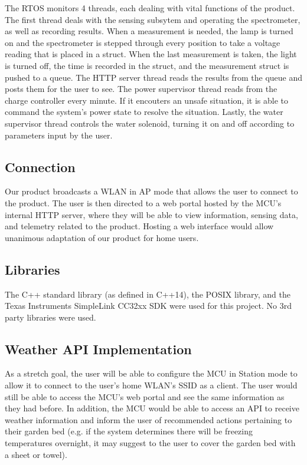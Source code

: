 \documentclass[journal]{IEEEtran}
\begin{document}
The RTOS monitors 4 threads, each dealing with vital functions of the product. The first thread deals with the sensing subsytem and operating the spectrometer, as well as recording results. When a measurement is needed, the lamp is turned on and the spectrometer is stepped through every position to take a voltage reading that is placed in a struct. When the last measurement is taken, the light is turned off, the time is recorded in the struct, and the measurement struct is pushed to a queue. The HTTP server thread reads the results from the queue and posts them for the user to see. The power supervisor thread reads from the charge controller every minute. If it encouters an unsafe situation, it is able to command the system's power state to resolve the situation. Lastly, the water supervisor thread controls the water solenoid, turning it on and off according to parameters input by the user.

\subsection{Connection}
Our product broadcasts a WLAN in AP mode that allows the user to connect to the product. The user is then directed to a web portal hosted by the MCU's internal HTTP server, where they will be able to view information, sensing data, and telemetry related to the product. Hosting a web interface would allow unanimous adaptation of our product for home users.

\subsection{Libraries}
The C++ standard library (as defined in C++14), the POSIX library, and the Texas Instruments SimpleLink CC32xx SDK were used for this project. No 3rd party libraries were used.

\subsection{Weather API Implementation}
As a stretch goal, the user will be able to configure the MCU in Station mode to allow it to connect to the user's home WLAN's SSID as a client. The user would still be able to access the MCU's web portal and see the same information as they had before. In addition, the MCU would be able to access an API to receive weather information and inform the user of recommended actions pertaining to their garden bed (e.g. if the system determines there will be freezing temperatures overnight, it may suggest to the user to cover the garden bed with a sheet or towel).
\end{document}
